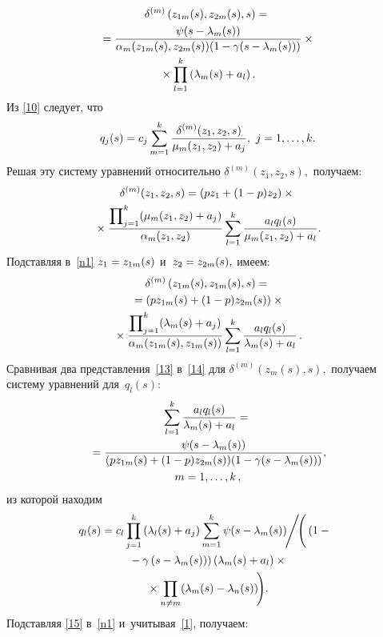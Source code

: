 \begin{multicols}{2}
\begin{multline}
\label{13}
\delta^{(m)}\left(z_{1m}(s),z_{2m}(s),s\right)={}\\
{}=\displaystyle\frac{\displaystyle \psi(s-\lambda_m(s))\mathstrut}{\displaystyle \alpha_m(z_{1m}(s),z_{2m}(s))
(1-\gamma(s-\lambda_m(s)))\mathstrut}\times{}\\
{}\times \prod\limits_{l=1}^k\left(\lambda_m(s)+a_l\right).
\end{multline}
Из \eqref{10} следует, что
$$
q_j(s)=c_j\sum\limits_{m=1}^k\displaystyle\frac{\displaystyle \delta^{(m)}(z_1,z_2,s)\mathstrut}{\displaystyle \mu_m(z_1,z_2)+a_j\mathstrut},\
j=1,\ldots,k .
$$
Решая эту систему уравнений относительно
$\delta^{(m)}(z_1,z_2,s),$ получаем:
\begin{multline}
\label{n1}
\delta^{(m)}(z_1,z_2,s)=\left(pz_1+(1-p)z_2\right)\times{}\\
{}\times
\displaystyle\frac{\displaystyle \prod\nolimits_{j=1}^k(\mu_m(z_1,z_2)+a_j)\mathstrut}{\displaystyle \alpha_m(z_1,z_2)\mathstrut}\sum\limits_{l=1}^k\frac{a_lq_l(s)}{\mu_m(z_1,z_2)+a_l}.
\end{multline}
Подставляя в~\eqref{n1} $z_1\hm=z_{1m}(s)$ и~$z_2\hm=z_{2m}(s),$ имеем:
\begin{multline}
\label{14}
\delta^{(m)}\left(z_{1m}(s),z_{1m}(s),s\right)={}\\
{}=
\left(pz_{1m}(s)+(1-p)z_{2m}(s)\right)\times{}\\
{}\times
\displaystyle\frac{\displaystyle \prod\nolimits_{j=1}^k
(\lambda_m(s)+a_j)\mathstrut}{\displaystyle \alpha_m(z_{1m}(s),z_{1m}(s))\mathstrut}
\sum\limits_{l=1}^k\displaystyle\frac{\displaystyle a_lq_l(s)\mathstrut}{\displaystyle \lambda_m(s)+a_l\mathstrut}\,.
\end{multline}
Сравнивая два представления~\eqref{13} в~\eqref{14} для
$\delta^{(m)}(z_m(s),s),$ получаем систему уравнений для~$q_l(s)$:
\begin{multline*}
\sum\limits_{l=1}^k\displaystyle\frac{\displaystyle a_lq_l(s)\mathstrut}{\displaystyle \lambda_m(s)+a_l\mathstrut}={}\\
{}=\displaystyle\frac{\displaystyle \psi(s-\lambda_m(s))\mathstrut}{\displaystyle (pz_{1m}(s)+(1-p)z_{2m}(s))
(1-\gamma(s-\lambda_m(s)))\mathstrut},\\
m=1,\ldots,k\,,
\end{multline*}
из которой находим
\begin{multline}
\hspace*{-3pt}q_l(s)=c_l\prod\limits_{j=1}^k
\left(\lambda_l(s)+a_j\right) 
\sum\limits_{m=1}^k
\psi(s-\lambda_m(s))\!\Bigg/ \!
\Bigg(\left(1-{}\right.\\
\left.
{}-\gamma\left(s-\lambda_m(s)\right)\right)(\lambda_m(s)+a_l)\times{}\\
{}\times \prod\limits_{n\ne m}(\lambda_m(s)-\lambda_n(s))\!\Bigg).
\label{15}
\end{multline}
Подставляя \eqref{15} в~\eqref{n1} и~учитывая~\eqref{1}, получаем:
\begin{multline*}

\end{multline*}
\end{multicols}
